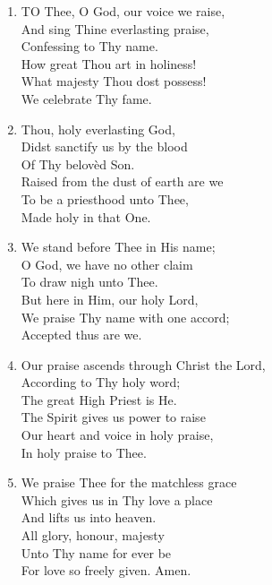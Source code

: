 \begin{enumerate}
    \item TO Thee, O God, our voice we raise, \\
        And sing Thine everlasting praise, \\
        Confessing to Thy name. \\
        How great Thou art in holiness! \\
        What majesty Thou dost possess! \\
        We celebrate Thy fame.

    \item Thou, holy everlasting God, \\
        Didst sanctify us by the blood \\
        Of Thy belov\`ed Son. \\
        Raised from the dust of earth are we \\
        To be a priesthood unto Thee, \\
        Made holy in that One.

    \item We stand before Thee in His name; \\
        O God, we have no other claim \\
        To draw nigh unto Thee. \\
        But here in Him, our holy Lord, \\
        We praise Thy name with one accord; \\
        Accepted thus are we.

    \item Our praise ascends through Christ the Lord, \\
        According to Thy holy word; \\
        The great High Priest is He. \\
        The Spirit gives us power to raise \\
        Our heart and voice in holy praise, \\
        In holy praise to Thee.

    \item We praise Thee for the matchless grace \\
        Which gives us in Thy love a place \\
        And lifts us into heaven. \\
        All glory, honour, majesty \\
        Unto Thy name for ever be \\
        For love so freely given. Amen.

\end{enumerate}

